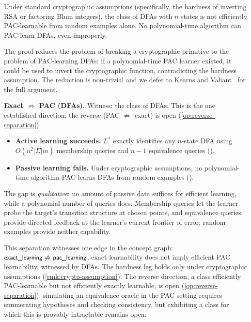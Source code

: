 \begin{thm}
\label{thm:dfa-pac-hard}
Under standard cryptographic assumptions (specifically, the hardness of inverting RSA or factoring Blum integers), the class of DFAs with $n$ states is not efficiently PAC-learnable from random examples alone. No polynomial-time algorithm can PAC-learn DFAs, even improperly.
\end{thm}

The proof reduces the problem of breaking a cryptographic primitive to the problem of PAC-learning DFAs: if a polynomial-time PAC learner existed, it could be used to invert the cryptographic function, contradicting the hardness assumption. The reduction is non-trivial and we defer to Kearns and Valiant~\cite{KearnsValiant1994} for the full argument.

\begin{separation}
\textbf{Exact $\not\Rightarrow$ PAC (DFAs).} Witness: the class of DFAs. This is the one established direction; the reverse (PAC $\not\Rightarrow$ exact) is open (\cref{op:reverse-separation}).
\begin{itemize}[leftmargin=*, nosep]
\item \textbf{Active learning succeeds.} $L^*$ exactly identifies any $n$-state DFA using $O(n^2 |\Sigma| m)$ membership queries and $n - 1$ equivalence queries ().
\item \textbf{Passive learning fails.} Under cryptographic assumptions, no polynomial-time algorithm PAC-learns DFAs from random examples ().
\end{itemize}
The gap is \emph{qualitative}: no amount of passive data suffices for efficient learning, while a polynomial number of queries does. Membership queries let the learner probe the target's transition structure at chosen points, and equivalence queries provide directed feedback at the learner's current frontier of error; random examples provide neither capability.
\end{separation}

This separation witnesses one edge in the concept graph: $\nde{exact\_learning} \not\Rightarrow \nde{pac\_learning}$, exact learnability does not imply efficient PAC learnability, witnessed by DFAs. The hardness leg holds only under cryptographic assumptions (\cref{rmk:crypto-assumption}). The reverse direction, a class efficiently PAC-learnable but not efficiently exactly learnable, is open (\cref{op:reverse-separation}): simulating an equivalence oracle in the PAC setting requires enumerating hypotheses and checking consistency, but exhibiting a class for which this is provably intractable remains open.

